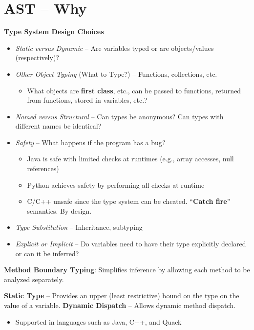\documentclass[10pt,twocolumn]{report}
\begin{document}
\section{AST -- Why}

\textbf{Type System Design Choices}
\begin{itemize}
  \item \textit{Static versus Dynamic} -- Are variables typed or are objects/values (respectively)?
  \item \textit{Other Object Typing} (What to Type?) -- Functions, collections, etc.
    \begin{itemize}
      \item What objects are \textbf{first class}, etc., can be passed to functions, returned from functions, stored in variables, etc.?
    \end{itemize}
  \item \textit{Named versus Structural} -- Can types be anonymous? Can types with different names be identical?
  \item \textit{Safety} -- What happens if the program has a bug?
    \begin{itemize}
      \item Java is safe with limited checks at runtimes (e.g., array accesses, null references)
      \item Python achieves safety by performing all checks at runtime
      \item C/C++ unsafe since the type system can be cheated. ``\textbf{Catch fire}'' semantics. By design.
    \end{itemize}

  \item \textit{Type Substitution} -- Inheritance, subtyping
  \item \textit{Explicit or Implicit} -- Do variables need to have their type explicitly declared or can it be inferred?
\end{itemize}

\textbf{Method Boundary Typing}: Simplifies inference by allowing each method to be analyzed separately.

\textbf{Static Type} -- Provides an upper (least restrictive) bound on the type on the value of a variable. \textbf{Dynamic Dispatch} -- Allows dynamic method dispatch.
\begin{itemize}
  \item Supported in languages such as Java, C++, and Quack
\end{itemize}
\end{document}

